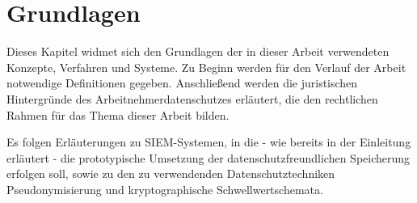 \chapter{Grundlagen}

\label{cha_basics}

Dieses Kapitel widmet sich den Grundlagen der in dieser Arbeit verwendeten Konzepte, Verfahren und Systeme. Zu Beginn werden für den Verlauf der Arbeit notwendige Definitionen gegeben. Anschließend werden die juristischen Hintergründe des Arbeitnehmerdatenschutzes erläutert, die den rechtlichen Rahmen für das Thema dieser Arbeit bilden. 

Es folgen Erläuterungen zu SIEM-Systemen, in die - wie bereits in der Einleitung erläutert - die prototypische Umsetzung der datenschutzfreundlichen Speicherung erfolgen soll, sowie zu den zu verwendenden Datenschutztechniken  Pseudonymisierung und kryptographische Schwellwertschemata.









